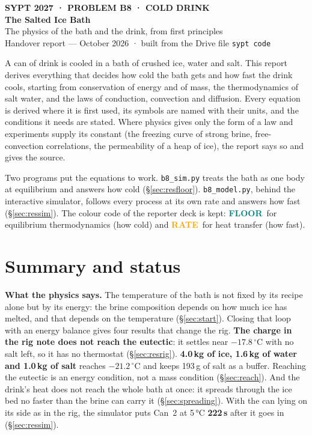 \documentclass[11pt,a4paper]{article}
\newcommand{\dC}{\,^{\circ}\mathrm{C}}
\newcommand{\code}[1]{\texttt{#1}}
\newcommand{\FLOOR}{\textcolor{teal}{\textsf{\bfseries FLOOR}}}
\newcommand{\RATE}{\textcolor{orange}{\textsf{\bfseries RATE}}}
\begin{document}
{\sffamily
{\color{teal}\small\bfseries SYPT 2027 · PROBLEM B8 · COLD DRINK}\\[3pt]
{\Huge\bfseries The Salted Ice Bath}\\[4pt]
{\large The physics of the bath and the drink, from first principles}\\[2pt]
{\color{grey}Handover report — October 2026 · built from the Drive file \code{sypt code}}\par
}
\vspace{4pt}
\noindent{\color{teal}\rule{\linewidth}{1.2pt}}\par

A can of drink is cooled in a bath of crushed ice, water and salt. This report derives everything
that decides how cold the bath gets and how fast the drink cools, starting from conservation of
energy and of mass, the thermodynamics of salt water, and the laws of conduction, convection and
diffusion. Every equation is derived where it is first used, its symbols are named with their units,
and the conditions it needs are stated. Where physics gives only the form of a law and experiments
supply its constant (the freezing curve of strong brine, free-convection correlations, the
permeability of a heap of ice), the report says so and gives the source.

Two programs put the equations to work. \code{b8\_sim.py} treats the bath as one body at
equilibrium and answers how cold (§\ref{sec:resfloor}). \code{b8\_model.py}, behind the
interactive simulator, follows every process at its own rate and answers how fast
(§\ref{sec:ressim}). The colour code of the reporter deck is kept: \FLOOR\ for equilibrium
thermodynamics (how cold) and \RATE\ for heat transfer (how fast).

{\small\tableofcontents}

\section{Summary and status}
\label{sec:summary}

\textbf{What the physics says.} The temperature of the bath is not fixed by its recipe alone but by
its energy: the brine composition depends on how much ice has melted, and that depends on the
temperature (§\ref{sec:start}). Closing that loop with an energy balance gives four results that change
the rig. \textbf{The charge in the rig note does not reach the eutectic}: it settles near
$-17.8\dC$ with no salt left, so it has no thermostat (§\ref{sec:resrig}). \textbf{4.0\,kg of ice,
1.6\,kg of water and 1.0\,kg of salt} reaches $-21.2\dC$ and keeps 193\,g of salt as a buffer.
Reaching the eutectic is an energy condition, not a mass condition (§\ref{sec:reach}). And the drink's
heat does not reach the whole bath at once: it spreads through the ice bed no faster than the brine
can carry it (§\ref{sec:spreading}). With the can lying on its side as in the rig, the simulator
puts Can~2 at 5\,°C \textbf{222\,s} after it goes in (§\ref{sec:ressim}).
\end{document}
